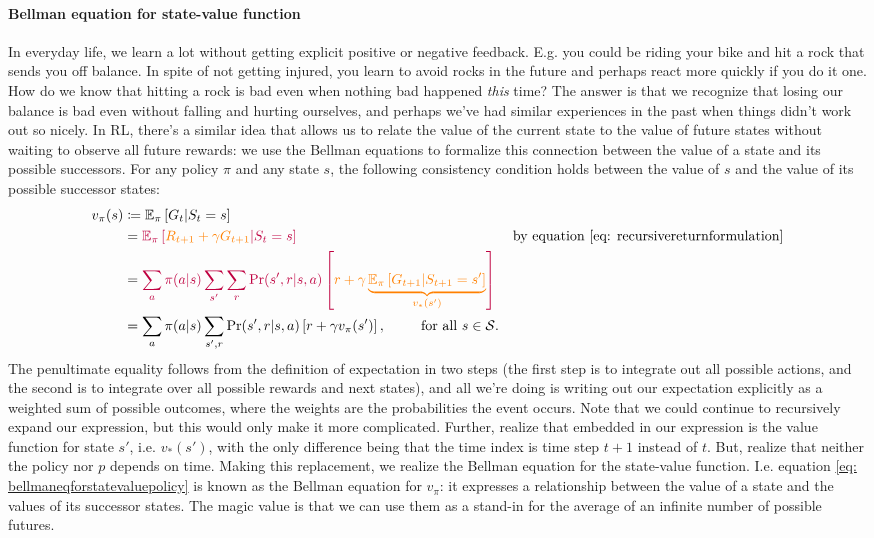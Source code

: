 \documentclass[12pt]{article}
\begin{document}
\paragraph{Bellman equation for state-value function}
In everyday life, we learn a lot without getting explicit positive or negative feedback. E.g. you could be riding your bike and hit a rock that sends you off balance. In spite of not getting injured, you learn to avoid rocks in the future and perhaps react more quickly if you do it one. How do we know that hitting a rock is bad even when nothing bad happened \emph{this} time? The answer is that we recognize that losing our balance is bad even without falling and hurting ourselves, and perhaps we've had similar experiences in the past when things didn't work out so nicely. In RL, there's a similar idea that allows us to relate the value of the current state to the value of future states without waiting to observe all future rewards: we use the Bellman equations to formalize this connection between the value of a state and its possible successors.
For any policy $\pi$ and any state $s$, the following consistency condition holds between the value of $s$ and the value of its possible successor states:
\begin{align}
  v_\pi(s) &\coloneqq \mathbb E_\pi \left[ G_t | S_t = s \right] \nonumber \\
           &= \color{purple} \mathbb E_\pi \left[ \color{orange} R_{t+1} + \gamma G_{t+1} \color{purple} | S_t = s \right] &\textrm{by equation } \ref{eq: recursivereturnformulation} \nonumber  \\
           &= \color{purple} \sum_a \pi(a|s) \sum_{s'} \sum_{r} \Pr(s',r|s,a) \left[ \color{orange} r + \gamma                           \underbrace{\mathbb E_\pi \left[G_{t+1} | S_{t+1} = s' \right]}_{v_*(s')} \color{purple} \right] \nonumber  \\
  \label{eq: bellmaneqforstatevaluepolicy}
           &= \sum_a \pi(a|s) \sum_{s',r} \Pr(s',r|s,a) \left[r + \gamma v_\pi(s')\right], \hspace{25pt} \textrm{for all } s \in \mathcal S.
\end{align}
The penultimate equality follows from the definition of expectation in two steps (the first step is to integrate out all possible actions, and the second is to integrate over all possible rewards and next states), and all we're doing is writing out our expectation explicitly as a weighted sum of possible outcomes, where the weights are the probabilities the event occurs. Note that we could continue to recursively expand our expression, but this would only make it more complicated. Further, realize that embedded in our expression is the value function for state $s'$, i.e. $v_*(s')$, with the only difference being that the time index is time step $t+1$ instead of $t$. But, realize that neither the policy nor $p$ depends on time. Making this replacement, we realize the Bellman equation for the state-value function. I.e. equation \ref{eq: bellmaneqforstatevaluepolicy} is known as the Bellman equation for $v_\pi$: it expresses a relationship between the value of a state and the values of its successor states. The magic value is that we can use them as a stand-in for the average of an infinite number of possible futures.
\end{document}
